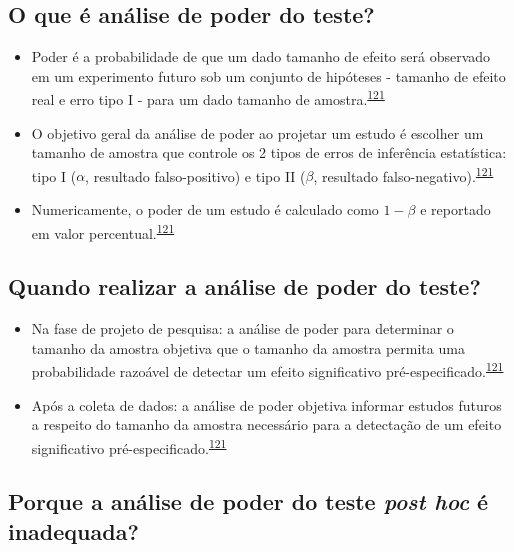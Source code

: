 \documentclass[
  a4paper,
]{book}
\begin{document}
\hypertarget{o-que-uxe9-anuxe1lise-de-poder-do-teste}{%
\subsection{O que é análise de poder do teste?}\label{o-que-uxe9-anuxe1lise-de-poder-do-teste}}

\begin{itemize}
\item
  Poder é a probabilidade de que um dado tamanho de efeito será observado em um experimento futuro sob um conjunto de hipóteses - tamanho de efeito real e erro tipo I - para um dado tamanho de amostra.\textsuperscript{\protect\hyperlink{ref-heckman2022}{121}}
\item
  O objetivo geral da análise de poder ao projetar um estudo é escolher um tamanho de amostra que controle os 2 tipos de erros de inferência estatística: tipo I (\(\alpha\), resultado falso-positivo) e tipo II (\(\beta\), resultado falso-negativo).\textsuperscript{\protect\hyperlink{ref-heckman2022}{121}}
\item
  Numericamente, o poder de um estudo é calculado como \(1-\beta\) e reportado em valor percentual.\textsuperscript{\protect\hyperlink{ref-heckman2022}{121}}
\end{itemize}

\hypertarget{quando-realizar-a-anuxe1lise-de-poder-do-teste}{%
\subsection{Quando realizar a análise de poder do teste?}\label{quando-realizar-a-anuxe1lise-de-poder-do-teste}}

\begin{itemize}
\item
  Na fase de projeto de pesquisa: a análise de poder para determinar o tamanho da amostra objetiva que o tamanho da amostra permita uma probabilidade razoável de detectar um efeito significativo pré-especificado.\textsuperscript{\protect\hyperlink{ref-heckman2022}{121}}
\item
  Após a coleta de dados: a análise de poder objetiva informar estudos futuros a respeito do tamanho da amostra necessário para a detectação de um efeito significativo pré-especificado.\textsuperscript{\protect\hyperlink{ref-heckman2022}{121}}
\end{itemize}

\hypertarget{porque-a-anuxe1lise-de-poder-do-teste-post-hoc-uxe9-inadequada}{%
\subsection{\texorpdfstring{Porque a análise de poder do teste \emph{post hoc} é inadequada?}{Porque a análise de poder do teste post hoc é inadequada?}}\label{porque-a-anuxe1lise-de-poder-do-teste-post-hoc-uxe9-inadequada}}
\end{document}
